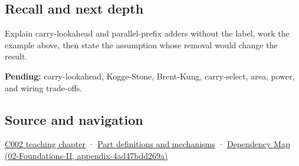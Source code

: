 \subsection{Recall and next depth}\label{appendix-b5c46b2d94ff-recall-and-next-depth}

Explain carry-lookahead and parallel-prefix adders without the label, work the example above, then state the assumption whose removal would change the result.

\textbf{Pending:} carry-lookahead, Kogge-Stone, Brent-Kung, carry-select, area, power, and wiring trade-offs.

\subsection{Source and navigation}\label{appendix-b5c46b2d94ff-source-and-navigation}

\hyperref[01-foundations-i-ch001-arithmetic-becomes-a-policy]{C002 teaching chapter} · \hyperref[appendix-fd090d982a15]{Part definitions and mechanisms} · \href{../02-Foundations-II/main.pdf\#nameddest=appendix-4ad47bdd269a}{Dependency Map (02-Foundations-II, appendix-4ad47bdd269a)}
